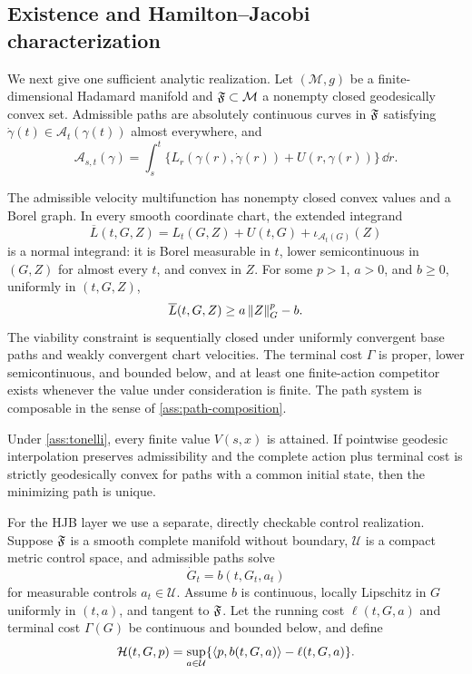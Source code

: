 \subsection{Existence and Hamilton--Jacobi characterization}

We next give one sufficient analytic realization.  Let
\((\mathcal M,g)\) be a finite-dimensional Hadamard manifold and
\(\mathfrak F\subset\mathcal M\) a nonempty closed geodesically convex set.  Admissible
paths are absolutely continuous curves in \(\mathfrak F\) satisfying
\(\dot\gamma(t)\in\mathcal A_t(\gamma(t))\) almost everywhere, and
\[
  \mathcal A_{s,t}(\gamma)
  =
  \int_s^t
  \{L_r(\gamma(r),\dot\gamma(r))+U(r,\gamma(r))\}\,\dd r.
\]

\begin{assumption}
\label{ass:tonelli}
The admissible velocity multifunction has nonempty closed convex values and a
Borel graph.  In every smooth coordinate chart, the extended integrand
\[
  \overline L(t,G,Z)
  =L_t(G,Z)+U(t,G)+\iota_{\mathcal A_t(G)}(Z)
\]
is a normal integrand: it is Borel measurable in \(t\), lower semicontinuous
in \((G,Z)\) for almost every \(t\), and convex in \(Z\).  For some
\(p>1\), \(a>0\), and \(b\ge0\), uniformly in \((t,G,Z)\),
\[
  \overline L(t,G,Z)\ge a\left\lVert Z\right\rVert_G^p-b.
\]
The viability constraint is sequentially closed under uniformly convergent
base paths and weakly convergent chart velocities.  The terminal cost
\(\Gamma\) is proper, lower semicontinuous, and bounded below, and at least one
finite-action competitor exists whenever the value under consideration is
finite.  The path system is composable in the sense of
\cref{ass:path-composition}.
\end{assumption}

\begin{theorem}
\label{thm:path-tonelli}
Under \cref{ass:tonelli}, every finite value \(V(s,x)\) is attained.  If
pointwise geodesic interpolation preserves admissibility and the complete
action plus terminal cost is strictly geodesically convex for paths with a
common initial state, then the minimizing path is unique.
\end{theorem}

For the HJB layer we use a separate, directly checkable control realization.
Suppose \(\mathfrak F\) is a smooth complete manifold without boundary,
\(\mathcal U\) is a compact metric control space, and admissible paths solve
\[
  \dot G_t=b(t,G_t,a_t)
\]
for measurable controls \(a_t\in\mathcal U\).  Assume \(b\) is continuous,
locally Lipschitz in \(G\) uniformly in \((t,a)\), and tangent to \(\mathfrak F\).
Let the running cost \(\ell(t,G,a)\) and terminal cost \(\Gamma(G)\) be
continuous and bounded below, and define
\[
  \mathcal H(t,G,p)
  =\sup_{a\in\mathcal U}
  \{\left\langle p,b(t,G,a)\right\rangle-\ell(t,G,a)\}.
\]

